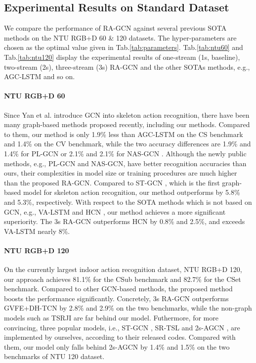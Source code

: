 \documentclass[journal]{IEEEtran}
\begin{document}
\subsection{Experimental Results on Standard Dataset}
\label{ssec:results}

We compare the performance of RA-GCN against several previous SOTA methods on the NTU RGB+D 60 \& 120 datasets. The hyper-parameters are chosen as the optimal value given in Tab.\ref{tab:parameters}. Tab.\ref{tab:ntu60} and Tab.\ref{tab:ntu120} display the experimental results of one-stream (1s, baseline), two-stream (2s), three-stream (3s) RA-GCN and the other SOTAs methods, e.g., AGC-LSTM \cite{si2019attention} and so on.

\paragraph{NTU RGB+D 60} Since Yan et al. \cite{yan2018spatial} introduce GCN into skeleton action recognition, there have been many graph-based methods proposed recently, including our methods. Compared to them, our method is only 1.9\% less than AGC-LSTM \cite{si2019attention} on the CS benchmark and 1.4\% on the CV benchmark, while the two accuracy differences are 1.9\% and 1.4\% for PL-GCN \cite{huang2020part} or 2.1\% and 2.1\% for NAS-GCN \cite{peng2020learning}. Although the newly public methods, e.g., PL-GCN and NAS-GCN, have better recognition accuracies than ours, their complexities in model size or training procedures are much higher than the proposed RA-GCN. Compared to ST-GCN \cite{yan2018spatial}, which is the first graph-based model for skeleton action recognition, our method outperforms by 5.8\% and 5.3\%, respectively. With respect to the SOTA methods which is not based on GCN, e.g., VA-LSTM \cite{zhang2017view} and HCN \cite{li2018co}, our method achieves a more significant superiority. The 3s RA-GCN outperforms HCN by 0.8\% and 2.5\%, and exceeds VA-LSTM nearly 8\%.

\paragraph{NTU RGB+D 120} On the currently largest indoor action recognition dataset, NTU RGB+D 120, our approach achieves 81.1\% for the CSub benchmark and 82.7\% for the CSet benchmark. Compared to other GCN-based methods, the proposed method boosts the performance significantly. Concretely, 3s RA-GCN outperforms GVFE+DH-TCN \cite{papadopoulos2019vertex} by 2.8\% and 2.9\% on the two benchmarks, while the non-graph models such as TSRJI \cite{caetano2019skeleton} are far behind our model. Futhermore, for more convincing, three popular models, i.e., ST-GCN \cite{yan2018spatial}, SR-TSL \cite{si2018skeleton} and 2s-AGCN \cite{shi2019two}, are implemented by ourselves, according to their released codes. Compared with them, our model only falls behind 2s-AGCN by 1.4\% and 1.5\% on the two benchmarks of NTU 120 dataset.
\end{document}
